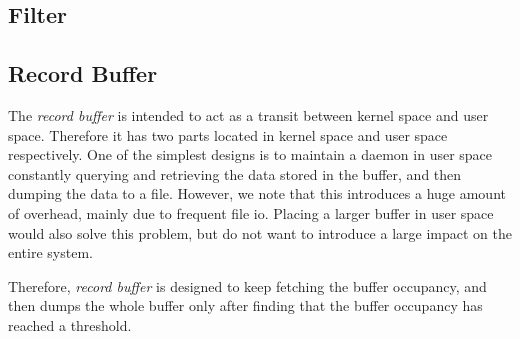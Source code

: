 









\subsection{Filter}



\subsection{Record Buffer}

The \textit{record buffer} is intended to act as a transit between kernel space and user space. Therefore it has two parts located in kernel space and user space respectively. One of the simplest designs is to maintain a daemon in user space constantly querying and retrieving the data stored in the buffer, and then dumping the data to a file. However, we note that this introduces a huge amount of overhead, mainly due to frequent file io. Placing a larger buffer in user space would also solve this problem, but \TheName do not want to introduce a large impact on the entire system.

Therefore, \textit{record buffer} is designed to keep fetching the buffer occupancy, and then dumps the whole buffer only after finding that the buffer occupancy has reached a threshold.